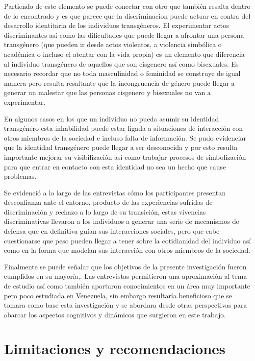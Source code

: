Partiendo de este elemento se puede conectar con otro que también resalta dentro
de lo encontrado y es que parece que la discriminacion puede actuar en contra
del desarrollo identitaria de los individuos transgéneros. El experimentar actos
discriminantes así como las dificultades que puede llegar a afrontar una persona
transgénero (que pueden ir desde actos violentos, a violencia simbólica o
académica o incluso el atentar con la vida propia) es un elemento que diferencia
al individuo transgénero de aquellos que son cisgenero así como bisexuales. Es
necesario recordar que no toda masculinidad o feminidad se construye de igual
manera pero resulta resaltante que la incongruencia de género puede llegar a
generar un malestar que las personas cisgenero y bisexuales no van a
experimentar.

En algunos casos en los que un individuo no pueda asumir su identidad
transgénero esta inhabilidad puede estar ligada a situaciones de interacción
con otros miembros de la sociedad e incluso falta de información. Se pudo
evidenciar que la identidad transgénero puede llegar a ser desconocida y por
esto resulta importante mejorar su visibilización así como trabajar procesos de
simbolización para que entrar en contacto con esta identidad no sea un hecho que
cause problemas.

Se evidenció a lo largo de las entrevistas cómo los participantes presentan
desconfianza ante el entorno, producto de las experiencias sufridas de
discriminación y rechazo a lo largo de su transición, estas vivencias
discriminativas llevaron a los individuos a generar una serie de mecanismos de
defensa que en definitiva guían sus interacciones sociales, pero que cabe
cuestionarse que peso pueden llegar a tener sobre la cotidianidad del individuo
así como en la forma que modelan sus interacción con otros miembros de la
sociedad.

Finalmente se puede señalar que los objetivos de la presente investigación
fueron cumplidos en su mayoría,. Las entrevistas permitieron una aproximación al
tema de estudio así como también aportaron conocimientos en un área muy
importante pero poco estudiada en Venezuela, sin embargo resultaría beneficioso
que se tomara como base esta investigación y se abordara desde otras
perspectivas para abarcar los aspectos cognitivos y dinámicos que surgieron en
este trabajo.

\section{Limitaciones y recomendaciones}

